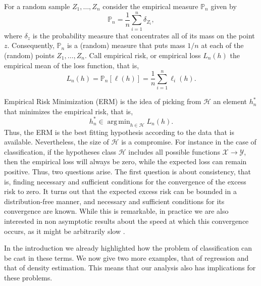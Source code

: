\documentclass{uvamath}
\newcommand*{\calH}{\mathcal{H}}
\newcommand*{\calX}{\mathcal{X}}
\newcommand*{\calY}{\mathcal{Y}}
\newcommand*{\bbP}{\mathbb{P}}
\DeclareMathOperator*{\argmin}{arg\,min}
\theoremstyle{remark}
\theoremstyle{definition}
\theoremstyle{definition}
\theoremstyle{definition}
\theoremstyle{definition}
\theoremstyle{definition}
\begin{document}
For a random sample $Z_1,\dots,Z_n$ consider the empirical measure
$\bbP_n$ given by
\begin{equation*}
  \bbP_n = \frac{1}{n}\sum_{i=1}^{n}\delta_{Z_i} ,
\end{equation*}
where $\delta_z$ is the probability measure that concentrates all of
its mass on the point $z$.  Consequently, $\bbP_n$ is a (random)
measure that puts mass $1/n$ at each of the (random) points
$Z_1, \dots, Z_n$. Call empirical risk, or empirical loss $L_n(h)$ the
empirical mean of the loss function, that is,
\begin{equation*}
  L_n(h) = \bbP_n [\ell(h)] = \frac{1}{n}\sum_{i=1}^n\ell_i(h).
\end{equation*}

Empirical Risk Minimization (ERM) is the idea of picking from $\calH$
an element $h^*_n$ that minimizes the empirical risk, that is,
\begin{equation*}
  h^*_n \in \argmin_{h\in \calH} L_n(h).
\end{equation*}
Thus, the ERM is the best fitting hypothesis according to the data
that is available. Nevertheless, the size of $\calH$ is a
compromise. For instance in the case of classification, if the
hypotheses class $\calH$ includes all possible functions
$\calX\to\calY$, then the empirical loss will always be zero, while
the expected loss can remain positive. Thus, two questions arise. The
first question is about consistency, that is, finding necessary and
sufficient conditions for the convergence of the excess risk to
zero. It turns out that the expected excess risk can be bounded in a
distribution-free manner, and necessary and sufficient conditions for
its convergence are known. While this is remarkable, in practice we
are also interested in non asymptotic results about the speed at which
this convergence occurs, as it might be arbitrarily slow
\citep[see][Chapter 7]{gyorfi_probabilistic_1996}.

In the introduction we already highlighted how the problem of
classification can be cast in these terms. We now give two more
examples, that of regression and that of density estimation. This
means that our analysis also has implications for these problems.
\end{document}
